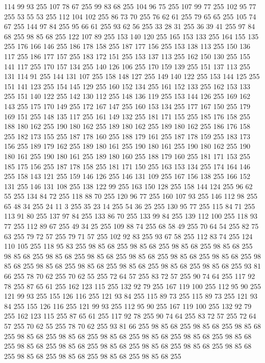 114 99 93 255 107 78 67 255 99 83 68 255 104 96 75 255 107 99 77 255 102 95 77 255 53 55 53 255 112 104 102 255 86 73 70 255 76 62 61 255 79 65 65 255 105 74 67 255 144 97 84 255 95 66 61 255 93 62 56 255 33 28 31 255 36 39 41 255 97 84 68 255 98 85 68 255 122 107 89 255 153 140 120 255 165 153 133 255 164 155 135 255 176 166 146 255 186 178 158 255 187 177 156 255 153 138 113 255 150 136 117 255 186 177 157 255 183 172 151 255 153 137 113 255 162 150 130 255 155 141 117 255 170 157 134 255 140 126 106 255 170 159 139 255 151 137 113 255 131 114 91 255 144 131 107 255 158 148 127 255 149 140 122 255 153 144 125 255 151 141 123 255 154 145 129 255 160 152 134 255 161 152 133 255 162 153 133 255 151 140 122 255 142 130 112 255 148 136 119 255 153 144 126 255 169 162 143 255 175 170 149 255 172 167 147 255 160 153 134 255 177 167 150 255 179 169 151 255 148 135 117 255 161 149 132 255 181 171 155 255 185 176 158 255 188 180 162 255 190 180 162 255 189 180 162 255
189 180 162 255 186 176 158 255 182 173 155 255 187 178 160 255 188 179 161 255 187 178 159 255 183 173 156 255 189 179 162 255 189 180 161 255 190 180 161 255 190 180 162 255 190 180 161 255 190 180 161 255 189 180 160 255 188 179 160 255 181 171 153 255 185 175 156 255 187 178 158 255 181 171 150 255 163 153 134 255 174 164 146 255 158 143 121 255 159 146 126 255 146 131 109 255 167 156 138 255 166 152 131 255 146 131 108 255 138 122 99 255 163 150 128 255 158 144 124 255 96 62 55 255 134 84 72 255 118 88 70 255 120 96 77 255 160 107 93 255 146 112 98 255 65 48 34 255 24 11 3 255 35 23 14 255 54 36 25 255 130 95 77 255 115 84 71 255 113 91 80 255 137 97 84 255 133 86 70 255 133 99 84 255 139 112 100 255 118 93 77 255 112 89 67 255 49 34 25 255 109 88 74 255 68 58 49 255 70 64 54 255 82 75 63 255 79 72 57 255 79 71 57 255 102 92 83 255 93 67 58 255 112 83 74 255 124 110 105 255 118 95 83 255 98 85 68 255 98 85 68 255 98 85 68 255
98 85 68 255 98 85 68 255 98 85 68 255 98 85 68 255 98 85 68 255 98 85 68 255 98 85 68 255 98 85 68 255 98 85 68 255 98 85 68 255 98 85 68 255 98 85 68 255 98 85 68 255 93 81 66 255 78 70 62 255 70 62 55 255 72 64 57 255 83 72 57 255 90 74 64 255 117 92 78 255 87 65 61 255 162 123 115 255 132 92 79 255 167 119 100 255 112 95 90 255 121 99 93 255 155 126 116 255 121 93 84 255 115 89 73 255 115 89 73 255 121 93 84 255 155 126 116 255 121 99 93 255 112 95 90 255 167 119 100 255 132 92 79 255 162 123 115 255 87 65 61 255 117 92 78 255 90 74 64 255 83 72 57 255 72 64 57 255 70 62 55 255 78 70 62 255 93 81 66 255 98 85 68 255 98 85 68 255 98 85 68 255 98 85 68 255 98 85 68 255 98 85 68 255 98 85 68 255 98 85 68 255 98 85 68 255 98 85 68 255 98 85 68 255 98 85 68 255 98 85 68 255 98 85 68 255 98 85 68 255 98 85 68 255 98 85 68 255 98 85 68 255 98 85 68 255
